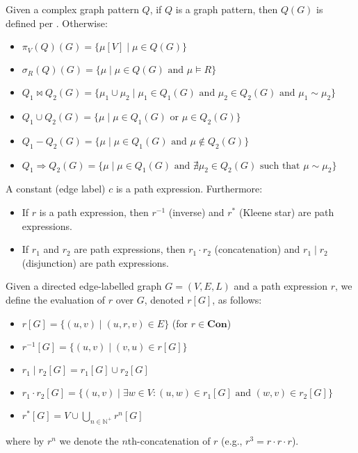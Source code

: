 \begin{definition}\label{def:complex-graph-pattern-evaluation}
    Given a complex graph pattern $Q$, if $Q$ is a graph pattern, then $Q(G)$ is defined per . Otherwise:
    \begin{itemize}
        \item $\pi_V(Q)(G) = \{\mu[V] \mid \mu \in Q(G)\}$
        \item $\sigma_R(Q)(G) = \{\mu \mid \mu \in Q(G) \text{ and } \mu \models R\}$
        \item $Q_1 \Join Q_2(G) = \{\mu_1 \cup \mu_2 \mid \mu_1 \in Q_1(G) \text{ and } \mu_2 \in Q_2(G) \text{ and } \mu_1 \sim \mu_2\}$
        \item $Q_1 \cup Q_2(G) = \{\mu \mid \mu \in Q_1(G) \text{ or } \mu \in Q_2(G)\}$
        \item $Q_1 - Q_2(G) = \{\mu \mid \mu \in Q_1(G) \text{ and } \mu \notin Q_2(G)\}$
        \item $Q_1 \Rightarrow Q_2(G) = \{\mu \mid \mu \in Q_1(G) \text{ and } \nexists \mu_2 \in Q_2(G) \text{ such that } \mu \sim \mu_2\}$
    \end{itemize}
\end{definition}

\begin{definition}\label{def:path-expression}
    A constant (edge label) $c$ is a path expression. Furthermore:
    \begin{itemize}
        \item If $r$ is a path expression, then $r^{-1}$ (inverse) and $r^*$ (Kleene star) are path expressions.
        \item If $r_1$ and $r_2$ are path expressions, then $r_1 \cdot r_2$ (concatenation) and $r_1 \mid r_2$ (disjunction) are path expressions.
    \end{itemize}
\end{definition}

\begin{definition}\label{def:path-expression-evaluation}
    Given a directed edge-labelled graph $G = (V, E, L)$ and a path expression $r$, we define the evaluation of $r$ over $G$, denoted $r[G]$, as follows:
    \begin{itemize}
        \item $r[G] = \{(u, v) \mid (u, r, v) \in E\}$ (for $r \in \textbf{Con}$)
        \item $r^{-1}[G] = \{(u, v) \mid (v, u) \in r[G]\}$
        \item $r_1 \mid r_2[G] = r_1[G] \cup r_2[G]$
        \item $r_1 \cdot r_2[G] = \{(u, v) \mid \exists w \in V : (u, w) \in r_1[G] \text{ and } (w, v) \in r_2[G]\}$
        \item $r^*[G] = V \cup \bigcup_{n \in \mathbb{N}^+} r^n[G]$
    \end{itemize}
    where by $r^n$ we denote the $n$th-concatenation of $r$ (e.g., $r^3 = r \cdot r \cdot r$).
\end{definition}


